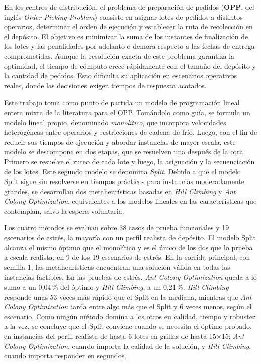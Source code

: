 En los centros de distribución, el problema de preparación de pedidos ({\bf OPP}, del inglés {\em Order Picking Problem}) consiste
en asignar lotes de pedidos a distintos operarios, determinar el orden de ejecución y establecer la ruta de recolección en el depósito.
El objetivo es minimizar la suma de los instantes de finalización de los lotes y las penalidades por adelanto o demora respecto a las fechas de entrega
comprometidas. Aunque la resolución exacta de este problema garantiza la optimidad, el tiempo de cómputo crece rápidamente con el tamaño del
depósito y la cantidad de pedidos. Esto dificulta su aplicación en escenarios operativos reales, donde las decisiones exigen tiempos
de respuesta acotados.

Este trabajo toma como punto de partida un modelo de programación lineal entera mixta de la literatura para el OPP. Tomándolo como guía,
se formula un modelo lineal propio, denominado {\em monolítico}, que incorpora velocidades heterogéneas entre operarios y restricciones
de cadena de frío. Luego, con el fin de reducir sus tiempos de ejecución y abordar instancias de mayor escala, este modelo se descompone en dos etapas, que se resuelven una después de la otra. Primero se resuelve el ruteo de cada lote y luego, la asignación y la
secuenciación de los lotes. Este segundo modelo se denomina {\em Split}. Debido a que el modelo Split sigue sin resolverse en tiempos
prácticos para instancias moderadamente grandes, se desarrollan dos metaheurísticas basadas en {\em Hill Climbing} y {\em Ant Colony Optimization},
equivalentes a los modelos lineales en las características que contemplan, salvo la espera voluntaria.

Los cuatro métodos se evalúan sobre 38 casos de prueba funcionales y 19 escenarios de estrés, la mayoría con un
perfil realista de depósito. El modelo Split alcanza el mismo óptimo que el monolítico y es el único de los dos que lo prueba a escala realista, en 9 de
los 19 escenarios de estrés. En la corrida principal, con semilla 1, las metaheurísticas encuentran una solución válida en todas las
instancias factibles. En las pruebas de
estrés, {\em Ant Colony Optimization} queda a lo sumo a un 0,04\,\% del óptimo y {\em Hill Climbing}, a un 0,21\,\%. {\em Hill Climbing} responde unas 53 veces
más rápido que el Split en la mediana, mientras que {\em Ant Colony Optimization} tarda entre algo más que el Split y
6 veces menos, según el escenario. Como ningún método domina a los otros en calidad, tiempo y robustez a la vez, se
concluye que el Split conviene cuando se necesita el óptimo probado, en instancias del perfil realista de hasta 6 lotes en grillas de hasta 15×15; {\em Ant
Colony Optimization}, cuando importa la calidad de la solución, y {\em Hill Climbing}, cuando importa responder en segundos.
